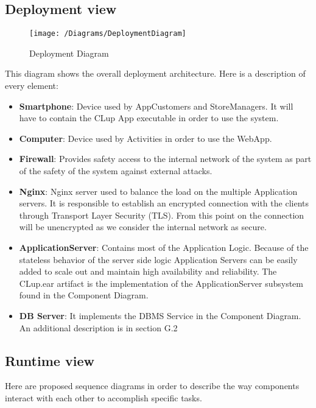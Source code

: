 \subsection{Deployment view}
\begin{figure}[H]
	\centering
	\texttt{[image: /Diagrams/DeploymentDiagram]}
	\caption{Deployment Diagram}
\end{figure}

This diagram shows the overall deployment architecture. Here is a description of every element:\\
\begin{itemize}
    \item \textbf{Smartphone}: Device used by AppCustomers and StoreManagers. It will have to contain the CLup App executable in order to use the system.
    
    \item \textbf{Computer}: Device used by Activities in order to use the WebApp.
    
    \item \textbf{Firewall}: Provides safety access to the internal network of the system as part of the safety of the system against external attacks.
    
    \item \textbf{Nginx}: Nginx server used to balance the load on the multiple Application servers. It is responsible to establish an encrypted connection with the clients through Transport Layer Security (TLS). From this point on the connection will be unencrypted as we consider the internal network as secure.
    
    \item \textbf{ApplicationServer}: Contains most of the Application Logic. Because of the stateless behavior of the server side logic Application Servers can be easily added to scale out and maintain high availability and reliability. The CLup.ear artifact is the implementation of the ApplicationServer subsystem found in the Component Diagram.
    
    \item \textbf{DB Server}: It implements the DBMS Service in the Component Diagram. An additional description is in section G.2

\end{itemize}



\subsection{Runtime view}
Here are proposed sequence diagrams in order to describe the way components interact with each other to accomplish specific tasks.\\

